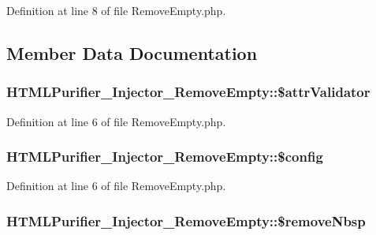Definition at line 8 of file Remove\+Empty.\+php.



\subsection{Member Data Documentation}
\hypertarget{classHTMLPurifier__Injector__RemoveEmpty_a9499c8d7739ae3441a18b40dc99edcb5}{
\subsubsection[{\$attr\+Validator}]{\setlength{\rightskip}{0pt plus 5cm}H\+T\+M\+L\+Purifier\+\_\+\+Injector\+\_\+\+Remove\+Empty\+::\$attr\+Validator}}\label{classHTMLPurifier__Injector__RemoveEmpty_a9499c8d7739ae3441a18b40dc99edcb5}


Definition at line 6 of file Remove\+Empty.\+php.

\hypertarget{classHTMLPurifier__Injector__RemoveEmpty_ac36aae9401621e42b25964c310783f08}{
\subsubsection[{\$config}]{\setlength{\rightskip}{0pt plus 5cm}H\+T\+M\+L\+Purifier\+\_\+\+Injector\+\_\+\+Remove\+Empty\+::\$config}}\label{classHTMLPurifier__Injector__RemoveEmpty_ac36aae9401621e42b25964c310783f08}


Definition at line 6 of file Remove\+Empty.\+php.

\hypertarget{classHTMLPurifier__Injector__RemoveEmpty_a3f3efa1b98fd2d89e36ba49193714f55}{
\subsubsection[{\$remove\+Nbsp}]{\setlength{\rightskip}{0pt plus 5cm}H\+T\+M\+L\+Purifier\+\_\+\+Injector\+\_\+\+Remove\+Empty\+::\$remove\+Nbsp}}\label{classHTMLPurifier__Injector__RemoveEmpty_a3f3efa1b98fd2d89e36ba49193714f55}



